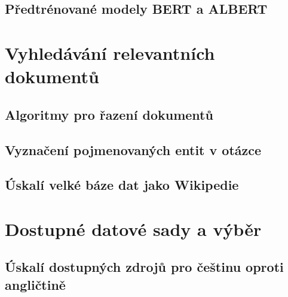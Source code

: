 \section{Předtrénované modely BERT a ALBERT}
\blindtext[8]




\chapter{Vyhledávání relevantních dokumentů}
\label{document_retrieval}

\blindtext[2]

\section{Algoritmy pro řazení dokumentů}
\blindtext[8]

\section{Vyznačení pojmenovaných entit v otázce}
\blindtext[8]

\section{Úskalí velké báze dat jako Wikipedie}
\blindtext[4]





\chapter{Dostupné datové sady a výběr}
\label{available_datasets}

\blindtext[2]

\section{Úskalí dostupných zdrojů pro češtinu oproti angličtině}
\blindtext[6]

